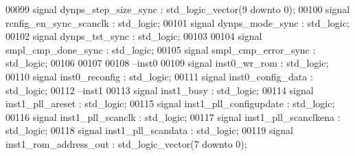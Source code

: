 \begin{DoxyCode}
00099 \textcolor{keywordflow}{signal} \textcolor{vhdlchar}{dynps_step_size_sync}      \textcolor{vhdlchar}{:} \textcolor{comment}{std\_logic\_vector}\textcolor{vhdlchar}{(}\textcolor{vhdllogic}{}\textcolor{vhdllogic}{9} \textcolor{keywordflow}{downto} \textcolor{vhdllogic}{}\textcolor{vhdllogic}{0}\textcolor{vhdlchar}{)};
00100 \textcolor{keywordflow}{signal} \textcolor{vhdlchar}{rcnfig_en_sync_scanclk}    \textcolor{vhdlchar}{:} \textcolor{comment}{std\_logic};
00101 \textcolor{keywordflow}{signal} \textcolor{vhdlchar}{dynps_mode_sync}           \textcolor{vhdlchar}{:} \textcolor{comment}{std\_logic};
00102 \textcolor{keywordflow}{signal} \textcolor{vhdlchar}{dynps_tst_sync}            \textcolor{vhdlchar}{:} \textcolor{comment}{std\_logic};
00103 
00104 \textcolor{keywordflow}{signal} \textcolor{vhdlchar}{smpl_cmp_done_sync}        \textcolor{vhdlchar}{:} \textcolor{comment}{std\_logic}; 
00105 \textcolor{keywordflow}{signal} \textcolor{vhdlchar}{smpl_cmp_error_sync}       \textcolor{vhdlchar}{:} \textcolor{comment}{std\_logic};
00106 
00107       
00108 \textcolor{keyword}{--inst0     }
00109 \textcolor{keywordflow}{signal} \textcolor{vhdlchar}{inst0_wr_rom}              \textcolor{vhdlchar}{:} \textcolor{comment}{std\_logic};
00110 \textcolor{keywordflow}{signal} \textcolor{vhdlchar}{inst0_reconfig}            \textcolor{vhdlchar}{:} \textcolor{comment}{std\_logic};
00111 \textcolor{keywordflow}{signal} \textcolor{vhdlchar}{inst0_config_data}         \textcolor{vhdlchar}{:} \textcolor{comment}{std\_logic};
00112 \textcolor{keyword}{--inst1}
00113 \textcolor{keywordflow}{signal} \textcolor{vhdlchar}{inst1_busy}                \textcolor{vhdlchar}{:} \textcolor{comment}{std\_logic};
00114 \textcolor{keywordflow}{signal} \textcolor{vhdlchar}{inst1_pll_areset}          \textcolor{vhdlchar}{:} \textcolor{comment}{std\_logic};
00115 \textcolor{keywordflow}{signal} \textcolor{vhdlchar}{inst1_pll_configupdate}    \textcolor{vhdlchar}{:} \textcolor{comment}{std\_logic};
00116 \textcolor{keywordflow}{signal} \textcolor{vhdlchar}{inst1_pll_scanclk}         \textcolor{vhdlchar}{:} \textcolor{comment}{std\_logic};
00117 \textcolor{keywordflow}{signal} \textcolor{vhdlchar}{inst1_pll_scanclkena}      \textcolor{vhdlchar}{:} \textcolor{comment}{std\_logic};
00118 \textcolor{keywordflow}{signal} \textcolor{vhdlchar}{inst1_pll_scandata}        \textcolor{vhdlchar}{:} \textcolor{comment}{std\_logic};
00119 \textcolor{keywordflow}{signal} \textcolor{vhdlchar}{inst1_rom_address_out}     \textcolor{vhdlchar}{:} \textcolor{comment}{std\_logic\_vector}\textcolor{vhdlchar}{(}\textcolor{vhdllogic}{}\textcolor{vhdllogic}{7} \textcolor{keywordflow}{downto} \textcolor{vhdllogic}{}\textcolor{vhdllogic}{0}\textcolor{vhdlchar}{)};

\end{DoxyCode}
